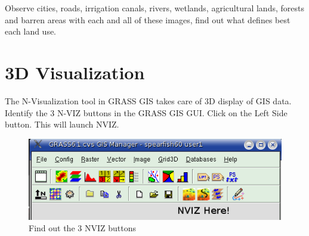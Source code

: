 Observe cities, roads, irrigation canals, rivers, wetlands, agricultural lands, forests and barren areas with each and all of these images, find out what defines best each land use.

\newpage
\section{3D Visualization}
\label{3D_visualization}


The N-Visualization tool in GRASS GIS takes care of 3D display of GIS data. Identify the 3 N-VIZ buttons in the GRASS GIS GUI. Click on the Left Side button. This will launch NVIZ.

\begin{figure}[htbp]
   \centering
   \includegraphics[scale=0.35]{nviz000.png}
   \caption{Find out the 3 NVIZ buttons}
   \label{fig:nviz000}
\end{figure}


